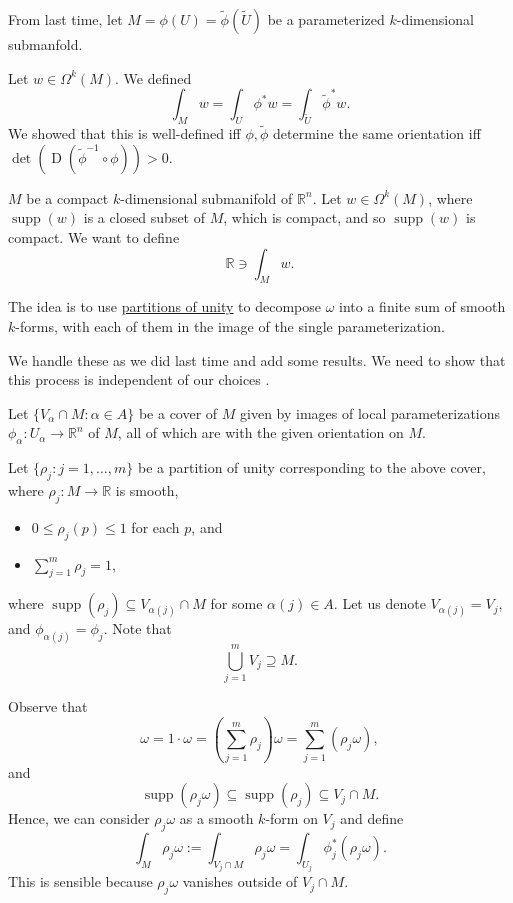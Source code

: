 \documentclass[notoc,notitlepage]{tufte-book}
\DeclareMathOperator{\D}{D}
\DeclareMathOperator{\supp}{supp}
\begin{document}
From last time, let $M = \phi(U) = \tilde{\phi}(\tilde{U})$ be a parameterized
$k$-dimensional submanfold.

Let $w \in \Omega^k(M)$. We defined
\begin{equation*}
  \int_{M} w = \int_{U} \phi^* w = \int_{\tilde{U}} \tilde{\phi}^* w .
\end{equation*}
We showed that this is well-defined iff $\phi, \tilde{\phi}$ determine the same
orientation iff $\det (\D (\tilde{\phi}^{-1} \circ \phi)) > 0$.

 $M$ be a compact $k$-dimensional submanifold of
$\mathbb{R}^n$. Let $w \in \Omega^k(M)$, where $\supp(w)$ is a closed subset of
$M$, which is compact, and so $\supp(w)$ is compact. We want to define
\begin{equation*}
  \mathbb{R} \ni \int_{M} w. 
\end{equation*}

The idea is to use \hyperref[sec:partitions_of_unity_continued]{partitions of
unity} to decompose $\omega$ into a finite sum of smooth $k$-forms, with each of them
 in the image of the single parameterization.

We handle these as we did last time and add some results. We need to show that
this process is independent of our choices .

Let $\{ V_\alpha \cap M : \alpha \in A \}$ be a cover of $M$ given by images of
local parameterizations $\phi_\alpha : U_\alpha \to \mathbb{R}^n$ of $M$, all of
which are  with the given orientation on $M$.

Let $\{ \rho_j : j = 1, \ldots, m \}$ be a partition of unity corresponding to
the above cover, where $\rho_j : M \to \mathbb{R}$ is smooth,
\begin{itemize}
  \item $0 \leq \rho_j(p) \leq 1$ for each $p$, and
  \item $\sum_{j=1}^{m} \rho_j = 1$,
\end{itemize}
where $\supp(\rho_j) \subseteq V_{\alpha(j)} \cap M$ for some $\alpha(j) \in A$.
Let us denote $V_{\alpha(j)} = V_j$, and $\phi_{\alpha(j)} = \phi_j$. Note that
\begin{equation*}
  \bigcup_{j=1}^{m} V_j \supseteq M.
\end{equation*}

Observe that
\begin{equation*}
  \omega = 1 \cdot \omega = \left( \sum_{j=1}^{m} \rho_j \right) \omega =
  \sum_{j=1}^{m} (\rho_j \omega),
\end{equation*}
and
\begin{equation*}
  \supp(\rho_j \omega) \subseteq \supp(\rho_j) \subseteq V_j \cap M.
\end{equation*}
Hence, we can consider $\rho_j \omega$ as a smooth $k$-form on $V_j$ and define
\begin{equation*}
  \int_{M} \rho_j \omega := \int_{V_j \cap M} \rho_j \omega = \int_{U_j}
  \phi_j^* (\rho_j \omega).
\end{equation*}
This is sensible because $\rho_j \omega$ vanishes outside of $V_j \cap M$.
\end{document}
